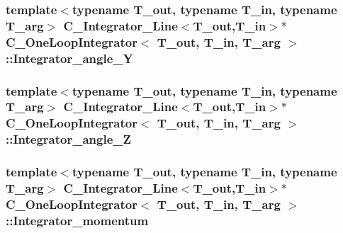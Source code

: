 \hypertarget{class_c___one_loop_integrator_a5770d28cb44d0ea9c3d331203ee84440}{
\subsubsection[{Integrator\-\_\-angle\-\_\-\-Y}]{\setlength{\rightskip}{0pt plus 5cm}template$<$typename T\-\_\-out, typename T\-\_\-in, typename T\-\_\-arg$>$ {\bf C\-\_\-\-Integrator\-\_\-\-Line}$<$T\-\_\-out,T\-\_\-in$>$$\ast$ {\bf C\-\_\-\-One\-Loop\-Integrator}$<$ T\-\_\-out, T\-\_\-in, T\-\_\-arg $>$\-::Integrator\-\_\-angle\-\_\-\-Y\hspace{0.3cm}{\ttfamily [protected]}}}\label{class_c___one_loop_integrator_a5770d28cb44d0ea9c3d331203ee84440}
\hypertarget{class_c___one_loop_integrator_a2826eadcd033a03808d645cd883acceb}{
\subsubsection[{Integrator\-\_\-angle\-\_\-\-Z}]{\setlength{\rightskip}{0pt plus 5cm}template$<$typename T\-\_\-out, typename T\-\_\-in, typename T\-\_\-arg$>$ {\bf C\-\_\-\-Integrator\-\_\-\-Line}$<$T\-\_\-out,T\-\_\-in$>$$\ast$ {\bf C\-\_\-\-One\-Loop\-Integrator}$<$ T\-\_\-out, T\-\_\-in, T\-\_\-arg $>$\-::Integrator\-\_\-angle\-\_\-\-Z\hspace{0.3cm}{\ttfamily [protected]}}}\label{class_c___one_loop_integrator_a2826eadcd033a03808d645cd883acceb}
\hypertarget{class_c___one_loop_integrator_af884706bf7461487cfb254d78b797e94}{
\subsubsection[{Integrator\-\_\-momentum}]{\setlength{\rightskip}{0pt plus 5cm}template$<$typename T\-\_\-out, typename T\-\_\-in, typename T\-\_\-arg$>$ {\bf C\-\_\-\-Integrator\-\_\-\-Line}$<$T\-\_\-out,T\-\_\-in$>$$\ast$ {\bf C\-\_\-\-One\-Loop\-Integrator}$<$ T\-\_\-out, T\-\_\-in, T\-\_\-arg $>$\-::Integrator\-\_\-momentum\hspace{0.3cm}{\ttfamily [protected]}}}\label{class_c___one_loop_integrator_af884706bf7461487cfb254d78b797e94}
